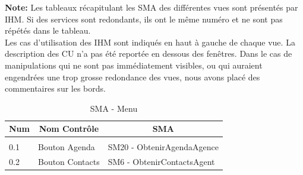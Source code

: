 \begin{shaded}
\textbf{Note: } Les tableaux récapitulant les SMA des différentes vues sont présentés par IHM. Si des services sont redondants, ils ont le même numéro et ne sont pas répétés dans le tableau. \\

Les cas d'utilisation des IHM sont indiqués en haut à gauche de chaque vue. La description des CU n'a pas été reportée en dessous des fenêtres. Dans le cas de manipulations qui ne sont pas immédiatement visibles, ou qui auraient engendrées une trop grosse redondance des vues, nous avons placé des commentaires sur les bords.
\end{shaded}

\begin{table}[H]
\centering
\caption{SMA - Menu}
\begin{tabular}{p{}p{}p{}}
\hline
Num & \multicolumn{1}{c}{Nom Contrôle} & \multicolumn{1}{c}{SMA} \\ \hline
\rowcolor[gray]{0.9}
\multicolumn{3}{l}{Menu}  \\
0.1 & Bouton Agenda & SM20 - ObtenirAgendaAgence \\
0.2 & Bouton Contacts & SM6 - ObtenirContactsAgent \\
\end{tabular}
\end{table}





